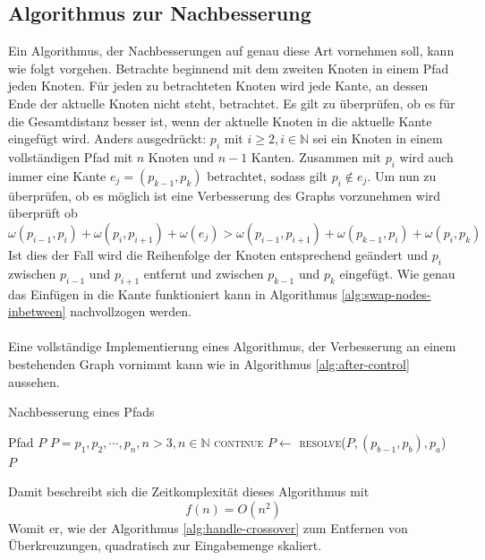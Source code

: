 \subsection{Algorithmus zur Nachbesserung}
Ein Algorithmus, der Nachbesserungen auf genau diese Art vornehmen soll, kann wie folgt vorgehen.
Betrachte beginnend mit dem zweiten Knoten in einem Pfad jeden Knoten.
Für jeden zu betrachteten Knoten wird jede Kante, an dessen Ende der aktuelle Knoten nicht steht, betrachtet.
Es gilt zu überprüfen, ob es für die Gesamtdistanz besser ist, wenn der aktuelle Knoten in die aktuelle Kante eingefügt wird.
Anders ausgedrückt: $p_i$ mit $i \geq 2,i\in\mathbb{N}$ sei ein Knoten in einem vollständigen Pfad mit $n$ Knoten und $n-1$ Kanten. Zusammen mit $p_i$ wird auch immer eine Kante $e_j=(p_{k-1},p_{k})$ betrachtet, sodass gilt $p_i \not \in e_j$.
Um nun zu überprüfen, ob es möglich ist eine Verbesserung des Graphs vorzunehmen wird überprüft ob 
$$\omega(p_{i-1},p_{i}) + \omega(p_{i},p_{i+1}) + \omega(e_j) > \omega(p_{i-1},p_{i+1}) + \omega(p_{k-1},p_i) + \omega(p_i,p_{k})$$
Ist dies der Fall wird die Reihenfolge der Knoten entsprechend geändert und $p_i$ zwischen $p_{i-1}$ und $p_{i+1}$ entfernt und zwischen $p_{k-1}$ und $p_k$ eingefügt. Wie genau das Einfügen in die Kante funktioniert kann in Algorithmus \vref{alg:swap-nodes-inbetween} nachvollzogen werden.
\\\\
Eine vollständige Implementierung eines Algorithmus, der Verbesserung an einem bestehenden Graph vornimmt kann wie in Algorithmus \vref{alg:after-control} aussehen.
\begin{algorithm}[h]
    \caption{Nachbesserung eines Pfads}
    \label{alg:after-control}
    \begin{algorithmic}[1]
        \Require Pfad $P$
        \Require $P=p_1,p_2,\cdots,p_n,n>3,n\in \mathbb{N}$
                    \State \textsc{continue}
                \EndIf
                    \State $P \gets$ \textsc{resolve}($P, (p_{b-1}, p_b), p_a$)
                \EndIf
            \EndFor
        \EndFor\\
        \Return $P$

    \end{algorithmic}
\end{algorithm}
Damit beschreibt sich die Zeitkomplexität dieses Algorithmus mit 
$$f(n) = O(n^2)$$
Womit er, wie der Algorithmus \vref{alg:handle-crossover} zum Entfernen von Überkreuzungen, quadratisch zur Eingabemenge skaliert.
